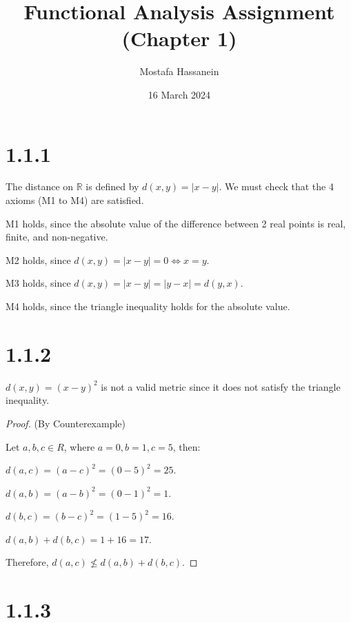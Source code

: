 \documentclass{article}
\author{Mostafa Hassanein}
\title{Functional Analysis Assignment (Chapter 1)}
\date{16 March 2024}
\begin{document}
\maketitle

\newpage

\section*{1.1.1}

The distance on $\mathbb{R}$ is defined by $d(x,y)=|x-y|$. We must check that the 4 axioms (M1 to M4) are satisfied.
\newline

M1 holds, since the absolute value of the difference between 2 real points is real, finite, and non-negative.
\newline

M2 holds, since $d(x,y) = |x-y| = 0 \iff x = y$. 
\newline

M3 holds, since $d(x,y) = |x-y| = |y-x| = d(y,x)$.
\newline

M4 holds, since the triangle inequality holds for the absolute value.


\section*{1.1.2}
$d(x,y) = (x-y)^2$ is not a valid metric since it does not satisfy the triangle inequality.

\begin{proof}{(By Counterexample)}
  $ $

  Let $a,b,c \in R$, where $a = 0, b = 1, c = 5$, then:
  \newline
  
  $d(a,c) = (a - c)^2 = (0 - 5)^2 = 25$.

  $d(a,b) = (a - b)^2 = (0 - 1)^2 = 1$.

  $d(b,c) = (b - c)^2 = (1 - 5)^2 = 16$.

  $d(a,b) + d(b,c) = 1 + 16 = 17$.
  \newline

  Therefore, 
  $d(a,c) \not \leq d(a,b) + d(b,c)$.

\end{proof}


\section*{1.1.3}
\end{document}
